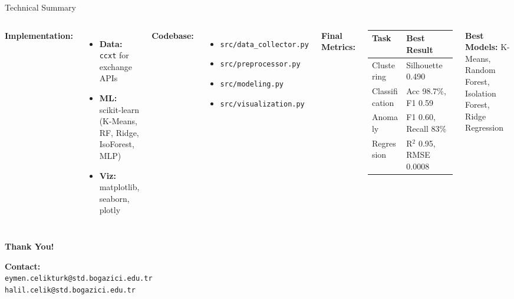 \documentclass[aspectratio=169]{beamer}
\begin{document}
\begin{frame}{Technical Summary}
\begin{columns}[t]
\textbf{Implementation:}
\begin{itemize}
    \item \textbf{Data:} \texttt{ccxt} for exchange APIs
    \item \textbf{ML:} scikit-learn (K-Means, RF, Ridge, IsoForest, MLP)
    \item \textbf{Viz:} matplotlib, seaborn, plotly
\end{itemize}

\vspace{0.2cm}
\textbf{Codebase:}
\begin{itemize}
    \item \texttt{src/data\_collector.py}
    \item \texttt{src/preprocessor.py}
    \item \texttt{src/modeling.py}
    \item \texttt{src/visualization.py}
\end{itemize}

\textbf{Final Metrics:}
\begin{table}[h]
\small
\begin{tabular}{ll}
\toprule
\textbf{Task} & \textbf{Best Result} \\
\midrule
Clustering & Silhouette 0.490 \\
Classification & Acc 98.7\%, F1 0.59 \\
Anomaly & F1 0.60, Recall 83\% \\
Regression & R\(^2\) 0.95, RMSE 0.0008 \\
\bottomrule
\end{tabular}
\end{table}

\vspace{0.2cm}
\textbf{Best Models:} K-Means, Random Forest, Isolation Forest, Ridge Regression
\end{columns}
\end{frame}

\begin{frame}[plain]
\begin{center}
\Huge \textbf{Thank You!}

\vspace{0.8cm}

\normalsize

\vspace{0.5cm}

\textbf{Contact:}\\
\texttt{eymen.celikturk@std.bogazici.edu.tr}\\
\texttt{halil.celik@std.bogazici.edu.tr}

\end{center}
\end{frame}
\end{document}
